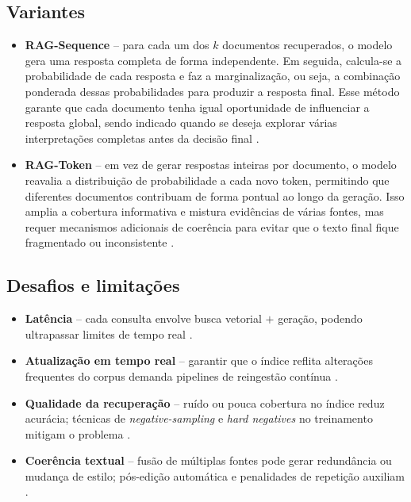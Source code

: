 \begin{description}
\subsection{Variantes}
\begin{itemize}
  \item \textbf{RAG-Sequence} – para cada um dos $k$ documentos recuperados, o modelo gera uma resposta completa de forma independente. Em seguida, calcula-se a probabilidade de cada resposta e faz a marginalização, ou seja, a combinação ponderada dessas probabilidades para produzir a resposta final. Esse método garante que cada documento tenha igual oportunidade de influenciar a resposta global, sendo indicado quando se deseja explorar várias interpretações completas antes da decisão final \cite{lewis2020rag,edwards2024hybrid}.
  \item \textbf{RAG-Token} – em vez de gerar respostas inteiras por documento, o modelo reavalia a distribuição de probabilidade a cada novo token, permitindo que diferentes documentos contribuam de forma pontual ao longo da geração. Isso amplia a cobertura informativa e mistura evidências de várias fontes, mas requer mecanismos adicionais de coerência para evitar que o texto final fique fragmentado ou inconsistente \cite{zhang2025fine}.
\end{itemize}

\subsection{Desafios e limitações}
\begin{itemize}
  \item \textbf{Latência} – cada consulta envolve busca vetorial $+$ geração,
        podendo ultrapassar limites de tempo real
        \cite{scalable2025overload}.
  \item \textbf{Atualização em tempo real} – garantir que o índice reflita
        alterações frequentes do corpus demanda pipelines de reingestão
        contínua \cite{taipalus2024vector}.
  \item \textbf{Qualidade da recuperação} – ruído ou pouca cobertura no índice
        reduz acurácia; técnicas de \textit{negative-sampling} e \textit{hard
        negatives} no treinamento mitigam o problema
        \cite{gao2023survey,salemi2024hallucination}.
  \item \textbf{Coerência textual} – fusão de múltiplas fontes pode gerar
        redundância ou mudança de estilo; pós-edição automática e
        penalidades de repetição auxiliam \cite{zhang2025fine}.
\end{itemize}


\end{description}
